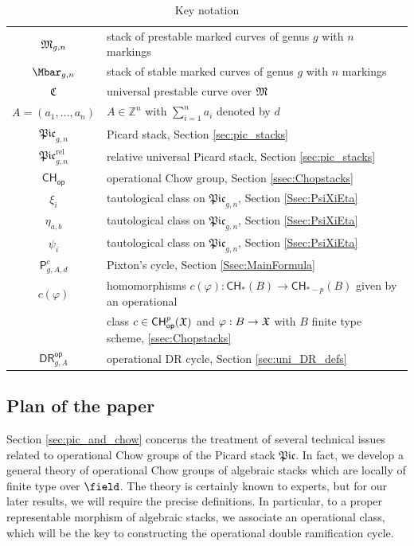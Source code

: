 \documentclass[a4paper,12pt]{article} %
\newcommand{\bb}[1]{{\mathbb{#1}}}
\theoremstyle{definition}
\theoremstyle{plain}%
\renewcommand{\phi}{\varphi}
\newcommand{\Picabs}{\mathfrak{Pic}}
\newcommand{\Picrel}{\mathfrak{Pic}^{\mathrm{rel}}}
\newcommand{\Chow}{\mathsf{CH}}
\newcommand{\CHop}{\Chow_{\mathsf{op}}}
\newcounter{nootje}
\newcommand\todo[1]{[*\thenootje]\marginpar{\tiny\begin{minipage}
{20mm}\begin{flushleft}\thenootje : 
#1\end{flushleft}\end{minipage}}\addtocounter{nootje}{1}}
\newcommand{\DRop}{\mathsf{DR}^{\mathsf{op}}}
\begin{document}
{\renewcommand{\arraystretch}{1.5}
\begin{table}[htp]
\caption{Key notation}
\begin{center}
\begin{tabular}{|c|l|}
\hline
$\frak M_{g,n}$ & stack of prestable marked curves of genus $g$ with $n$ markings\\
$\Mbar_{g, n}$ & stack of stable marked curves of genus $g$ with $n$ markings\\
$\frak C$ & universal prestable curve over $\frak M$ \\
$A = (a_1, \dots, a_n)$ & $A\in \bb Z^n$ with $\sum_{i=1}^n a_i$  denoted by $d$\\
$\Picabs_{g,n}$ &  Picard stack,  Section \ref{sec:pic_stacks}  \\ 
$\Picrel_{g,n}$ & relative universal Picard stack,  Section \ref{sec:pic_stacks} \\
$\CHop$ & operational Chow group, Section \ref{ssec:Chopstacks}    \\
$\xi_i$ &  tautological class on $\Picabs_{g,n}$, Section \ref{Ssec:PsiXiEta}\\
$\eta_{a,b}$ &  tautological class on $\Picabs_{g,n}$, Section \ref{Ssec:PsiXiEta}\\
$\psi_i$ &  tautological class on $\Picabs_{g,n}$, Section \ref{Ssec:PsiXiEta}\\
$\mathsf{P}_{g,A,d}^{c}$ & Pixton's cycle, Section \ref{Ssec:MainFormula}\\
$c(\phi)$& homomorphisms $c(\phi): \Chow_*(B) \to \Chow_{*-p}(B)$ given by an operational \\
~& class $c \in \CHop^p(\frak X)$ and $\phi: B \to \frak X$ with $B$ finite type scheme, \cref{ssec:Chopstacks}\\
$\DRop_{g,A}$&  operational DR cycle, Section \ref{sec:uni_DR_defs}\\
\hline
\end{tabular}
\end{center}
\label{default}
\end{table}%
}



\subsection{Plan of the paper}


Section \ref{sec:pic_and_chow}  concerns
 the treatment
of several technical issues related to operational Chow groups
of 
the Picard stack $\Picabs$.
In fact,
we develop a general theory of operational Chow groups of algebraic stacks which are
locally of finite type over ${\field}$. 
The theory is certainly known to experts, but for our later results, we will require
the precise definitions. In particular, to a proper representable morphism of algebraic stacks, we associate an operational class, which will be the key to constructing the operational double ramification cycle. 
\end{document}
